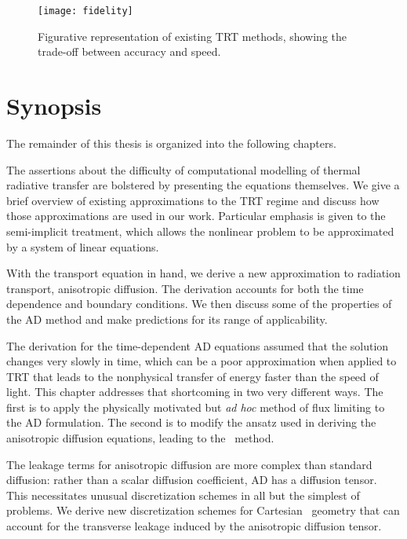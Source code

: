\begin{figure}[htb]
  \centering
  \texttt{[image: fidelity]}
  \caption{Figurative representation of existing TRT methods, showing the
  trade-off between accuracy and speed.}
  \label{fig:fidelity}
\end{figure}

\section{Synopsis}
The remainder of this thesis is organized into the following chapters.

The assertions about the difficulty of computational modelling of thermal
radiative transfer are bolstered by presenting the equations themselves. We give
a brief overview of existing approximations to the TRT regime and discuss how
those approximations are used in our work. Particular emphasis is given to the
semi-implicit treatment, which allows the nonlinear problem to be approximated
by a system of linear equations.

With the transport equation in hand, we derive a new approximation to radiation
transport, anisotropic diffusion. The derivation accounts for both the time
dependence and boundary conditions. We then discuss some of the properties of
the AD method and make predictions for its range of applicability.

The derivation for the time-dependent AD equations assumed that the solution
changes very slowly in time, which can be a poor approximation when applied to
TRT that leads to the nonphysical transfer of energy faster than the speed of
light. This chapter addresses that shortcoming in two very different ways. The
first is to apply the physically motivated but \emph{ad hoc} method of flux
limiting to the AD formulation. The second is to modify the ansatz used in
deriving the anisotropic diffusion equations, leading to the \APone\ method.

The leakage terms for anisotropic diffusion are more complex than standard
diffusion: rather than a scalar diffusion coefficient, AD has a diffusion
tensor. This necessitates unusual discretization schemes in all but the simplest
of problems. We derive new discretization schemes for Cartesian \xy\ geometry
that can account for the transverse leakage induced by the anisotropic diffusion
tensor.

